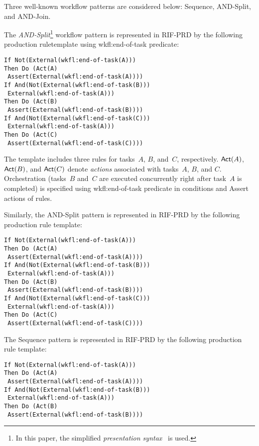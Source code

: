 \begin{multicols}{2}
\addtocounter{figure}{1}

  Three well-known workflow patterns are considered below: {\sf Sequence},
{\sf AND-Split}, and {\sf AND-Join}.

  The \textit{AND-Split}\footnote{In this paper, the simplified \textit{presentation
syntax}~\cite{7-kal} is used.} workflow pattern is represented in RIF-PRD by the
following production ruletemplate using {\sf wkfl:end-of-task} predicate:
  \begin{verbatim}
If Not(External(wkfl:end-of-task(A)))
Then Do (Act(A)
 Assert(External(wkfl:end-of-task(A))))
If And(Not(External(wkfl:end-of-task(B)))
 External(wkfl:end-of-task(A)))
Then Do (Act(B)
 Assert(External(wkfl:end-of-task(B))))
If And(Not(External(wkfl:end-of-task(C)))
 External(wkfl:end-of-task(A)))
Then Do (Act(C)
 Assert(External(wkfl:end-of-task(C))))
\end{verbatim}

  The template includes three rules for tasks~$A$, $B$, and~$C$, respectively.
${\sf Act}(A)$, ${\sf Act}(B)$, and ${\sf Act}(C)$ denote \textit{actions} associated with tasks~$A$,
$B$, and $C$. Orchestration (tasks~$B$ and~$C$ are executed concurrently right after
task~$A$ is completed) is specified using {\sf wkfl:end-of-task} predicate in
conditions and {\sf Assert} actions of rules.

  Similarly, the {\sf AND-Split} pattern is represented in RIF-PRD by the
following production rule template:

\vspace*{-1.5pt}

\noindent
  \begin{verbatim}
If Not(External(wkfl:end-of-task(A)))
Then Do (Act(A)
 Assert(External(wkfl:end-of-task(A))))
If And(Not(External(wkfl:end-of-task(B)))
 External(wkfl:end-of-task(A)))
Then Do (Act(B)
 Assert(External(wkfl:end-of-task(B))))
If And(Not(External(wkfl:end-of-task(C)))
 External(wkfl:end-of-task(A)))
Then Do (Act(C)
 Assert(External(wkfl:end-of-task(C))))
\end{verbatim}

\vspace*{-1.5pt}

  The {\sf Sequence} pattern is represented in RIF-PRD by the following
production rule template:

\vspace*{-1.5pt}

\noindent
  \begin{verbatim}
If Not(External(wkfl:end-of-task(A)))
Then Do (Act(A)
 Assert(External(wkfl:end-of-task(A))))
If And(Not(External(wkfl:end-of-task(B)))
 External(wkfl:end-of-task(A)))
Then Do (Act(B)
 Assert(External(wkfl:end-of-task(B))))
\end{verbatim}


\end{multicols}

